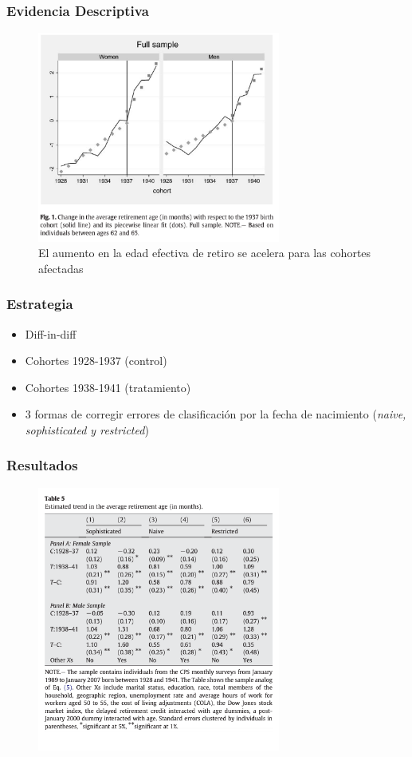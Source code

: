 \documentclass{beamer}
\begin{document}
 
  \frame
  {
    \frametitle{Evidencia Descriptiva}
      \begin{figure}[htp]
        \centering
        \includegraphics[width=8cm]{imgs/mastrobouni-fig1}
        \caption{El aumento en la edad efectiva de retiro se acelera para las cohortes afectadas}
        \label{fig:fig2}
      \end{figure}
  }
  \frame
  {
    \frametitle{Estrategia}
    \begin{itemize}
      \item Diff-in-diff
      \item Cohortes 1928-1937 (control)
      \item Cohortes 1938-1941 (tratamiento)
      \item 3 formas de corregir errores de clasificación por la fecha de nacimiento (\textit{naive, sophisticated y restricted})
    \end{itemize}
  }
  \frame
  {
    \frametitle{Resultados}
      \begin{figure}[htp]
        \centering
        \includegraphics[width=8cm]{imgs/mastrobouni-tab5}
        \label{fig:fig2}
      \end{figure}
  }
\end{document}
